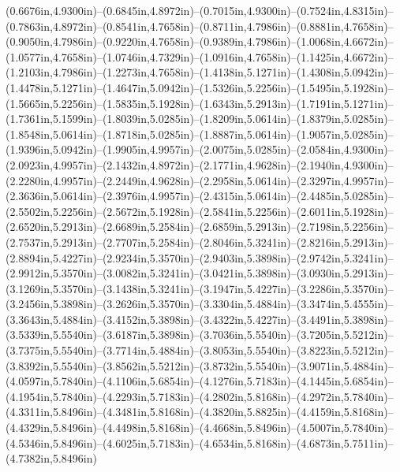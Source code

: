 (0.6676in,4.9300in)--(0.6845in,4.8972in)--(0.7015in,4.9300in)--(0.7524in,4.8315in)--(0.7863in,4.8972in)--(0.8541in,4.7658in)--(0.8711in,4.7986in)--(0.8881in,4.7658in)--(0.9050in,4.7986in)--(0.9220in,4.7658in)--(0.9389in,4.7986in)--(1.0068in,4.6672in)--(1.0577in,4.7658in)--(1.0746in,4.7329in)--(1.0916in,4.7658in)--(1.1425in,4.6672in)--(1.2103in,4.7986in)--(1.2273in,4.7658in)--(1.4138in,5.1271in)--(1.4308in,5.0942in)--(1.4478in,5.1271in)--(1.4647in,5.0942in)--(1.5326in,5.2256in)--(1.5495in,5.1928in)--(1.5665in,5.2256in)--(1.5835in,5.1928in)--(1.6343in,5.2913in)--(1.7191in,5.1271in)--(1.7361in,5.1599in)--(1.8039in,5.0285in)--(1.8209in,5.0614in)--(1.8379in,5.0285in)--(1.8548in,5.0614in)--(1.8718in,5.0285in)--(1.8887in,5.0614in)--(1.9057in,5.0285in)--(1.9396in,5.0942in)--(1.9905in,4.9957in)--(2.0075in,5.0285in)--(2.0584in,4.9300in)--(2.0923in,4.9957in)--(2.1432in,4.8972in)--(2.1771in,4.9628in)--(2.1940in,4.9300in)--(2.2280in,4.9957in)--(2.2449in,4.9628in)--(2.2958in,5.0614in)--(2.3297in,4.9957in)--(2.3636in,5.0614in)--(2.3976in,4.9957in)--(2.4315in,5.0614in)--(2.4485in,5.0285in)--(2.5502in,5.2256in)--(2.5672in,5.1928in)--(2.5841in,5.2256in)--(2.6011in,5.1928in)--(2.6520in,5.2913in)--(2.6689in,5.2584in)--(2.6859in,5.2913in)--(2.7198in,5.2256in)--(2.7537in,5.2913in)--(2.7707in,5.2584in)--(2.8046in,5.3241in)--(2.8216in,5.2913in)--(2.8894in,5.4227in)--(2.9234in,5.3570in)--(2.9403in,5.3898in)--(2.9742in,5.3241in)--(2.9912in,5.3570in)--(3.0082in,5.3241in)--(3.0421in,5.3898in)--(3.0930in,5.2913in)--(3.1269in,5.3570in)--(3.1438in,5.3241in)--(3.1947in,5.4227in)--(3.2286in,5.3570in)--(3.2456in,5.3898in)--(3.2626in,5.3570in)--(3.3304in,5.4884in)--(3.3474in,5.4555in)--(3.3643in,5.4884in)--(3.4152in,5.3898in)--(3.4322in,5.4227in)--(3.4491in,5.3898in)--(3.5339in,5.5540in)--(3.6187in,5.3898in)--(3.7036in,5.5540in)--(3.7205in,5.5212in)--(3.7375in,5.5540in)--(3.7714in,5.4884in)--(3.8053in,5.5540in)--(3.8223in,5.5212in)--(3.8392in,5.5540in)--(3.8562in,5.5212in)--(3.8732in,5.5540in)--(3.9071in,5.4884in)--(4.0597in,5.7840in)--(4.1106in,5.6854in)--(4.1276in,5.7183in)--(4.1445in,5.6854in)--(4.1954in,5.7840in)--(4.2293in,5.7183in)--(4.2802in,5.8168in)--(4.2972in,5.7840in)--(4.3311in,5.8496in)--(4.3481in,5.8168in)--(4.3820in,5.8825in)--(4.4159in,5.8168in)--(4.4329in,5.8496in)--(4.4498in,5.8168in)--(4.4668in,5.8496in)--(4.5007in,5.7840in)--(4.5346in,5.8496in)--(4.6025in,5.7183in)--(4.6534in,5.8168in)--(4.6873in,5.7511in)--(4.7382in,5.8496in) 